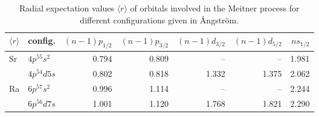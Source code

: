 \begin{table}[h]
 \centering
 \caption{Radial expectation values $\langle r \rangle$ of
          orbitals involved in the Meitner process
          for different configurations
          given in {\AA}ngstr{\"o}m.
}
 \begin{tabular}{llrrrrr}
  \toprule
   $\langle r \rangle$ &     config. &   $(n-1)p_{1/2}$ & $(n-1)p_{3/2}$ & $(n-1)d_{3/2}$ & $(n-1)d_{5/2}$ & $ns_{1/2}$\\
  \midrule
   \multirow{2}{*}{Sr} & $4p^55s^2$ & 0.794 &     0.809    &      --        &        --      &  1.981\\
       &      $4p^54d5s$ &            0.802 &     0.818    &    1.332       &      1.375     &  2.062\\
   \multirow{2}{*}{Ra} & $6p^57s^2$ & 0.996 &     1.114    &      --        &        --      &  2.244\\
       &      $6p^56d7s$ &            1.001 &     1.120    &    1.768       &      1.821     &  2.290\\
  \bottomrule
 \end{tabular}
 \label{tab:widths}
\end{table}
